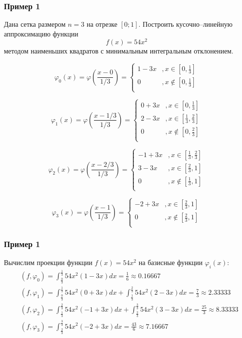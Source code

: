 \documentclass[10pt]{beamer}
\begin{document}
\begin{frame}[fragile]
\frametitle{Пример 1}
Дана сетка размером $n=3$ на отрезке $[0;1]$. Построить кусочно--линейную аппроксимацию функции 
$$f(x) = 54 x^2$$
 методом наименьших квадратов с минимальным интегральным отклонением.

$$
\varphi_0 (x) = \varphi \left(\frac{x - 0}{1/3} \right) =
\begin{cases}
1 - 3x &, x \in \left[0, \frac{1}{3} \right]\\
0      &, x \not \in \left[0, \frac{1}{3} \right]\\
\end{cases}
$$

$$
\varphi_1 (x) = \varphi \left(\frac{x - 1/3}{1/3} \right) =
\begin{cases}
0 + 3x &, x \in \left[0, \frac{1}{3} \right]\\
2 - 3x &, x \in \left[\frac{1}{3}, \frac{2}{3} \right]\\
0      &, x \not \in \left[0, \frac{2}{3} \right]\\
\end{cases}
$$

$$
\varphi_2 (x) = \varphi \left(\frac{x - 2/3}{1/3} \right) =
\begin{cases}
-1 + 3x &, x \in \left[\frac{1}{3}, \frac{2}{3} \right]\\
3 - 3x &, x \in \left[\frac{2}{3}, 1 \right]\\
0      &, x \not \in \left[\frac{1}{3}, 1 \right]\\
\end{cases}
$$

$$
\varphi_3 (x) = \varphi \left(\frac{x - 1}{1/3} \right) =
\begin{cases}
-2 + 3x &, x \in \left[ \frac{2}{3}, 1 \right]\\
0      &, x \not \in \left[\frac{2}{3}, 1 \right]\\
\end{cases}
$$
\end{frame}

\begin{frame}[fragile]
\frametitle{Пример 1}
Вычислим проекции функции $f(x) = 54 x^2$ на базисные функции $\varphi_i(x)$:
\begin{equation*}
\begin{aligned}
&(f, \varphi_0) = \int_{\frac{0}{3}}^{\frac{1}{3}} 54 x^2 (1 - 3x) dx = \frac{1}{6} \approx 0.16667\\
&(f, \varphi_1) = \int_{\frac{0}{3}}^{\frac{1}{3}} 54 x^2 (0 + 3x) dx + \int_{\frac{1}{3}}^{\frac{2}{3}} 54 x^2 (2 - 3x) dx= \frac{7}{3} \approx 2.33333\\
&(f, \varphi_2) = \int_{\frac{1}{3}}^{\frac{2}{3}} 54 x^2 (-1 + 3x) dx + \int_{\frac{2}{3}}^{\frac{3}{3}} 54 x^2 (3 - 3x) dx= \frac{25}{3} \approx 8.33333\\
&(f, \varphi_3) = \int_{\frac{2}{3}}^{\frac{3}{3}} 54 x^2 (-2 + 3x) dx = \frac{43}{6} \approx 7.16667\\
\end{aligned}
\end{equation*}
\end{frame}
\end{document}
